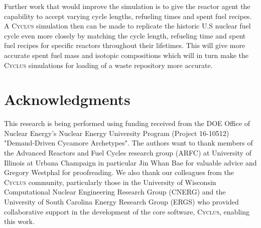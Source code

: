 \documentclass{anstrans}
\newcommand{\Cyclus}{\textsc{Cyclus}\xspace}%
\begin{document}
Further work that would improve the simulation is to give the reactor agent the 
capability to accept varying cycle lengths, refueling times and spent fuel 
recipes. A \Cyclus simulation then can be made to replicate the historic U.S 
nuclear fuel cycle even more closely by matching the cycle length, refueling 
time and spent fuel recipes for specific reactors throughout their lifetimes. 
This will give more accurate spent fuel mass and isotopic compositions which 
will in turn make the \Cyclus simulations for loading of a waste repository 
more accurate. 

\section{Acknowledgments}
This research is being performed using funding received from the DOE Office of 
Nuclear Energy's Nuclear Energy University Program (Project 16-10512) 
"Demand-Driven Cycamore Archetypes". The authors want to thank members of the 
Advanced Reactors and Fuel Cycles research group (ARFC) at University of 
Illinois at Urbana Champaign in particular Jin Whan Bae for valuable advice and 
Gregory Westphal for proofreading. We also thank our colleagues from the 
\Cyclus community, particularly those in the University of Wisconsin 
Computational Nuclear Engineering Research Group (CNERG) and the University of 
South Carolina Energy Research Group (ERGS) who provided collaborative support 
in the development of the core software, \Cyclus, enabling this work. 



\end{document}
